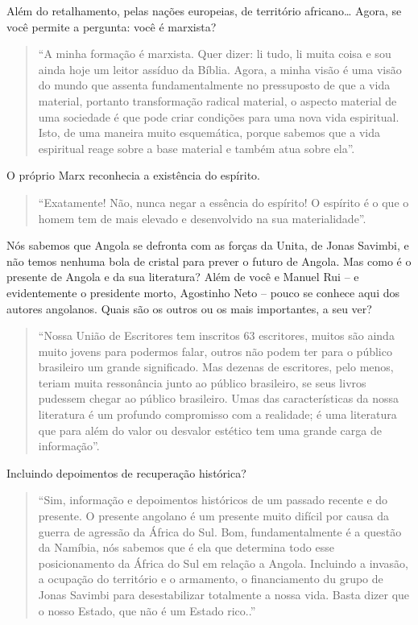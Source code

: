 \documentclass[
  letterpaper,
  DIV=11,
  numbers=noendperiod]{scrreprt}
\begin{document}
Além do retalhamento, pelas nações europeias, de território
africano\ldots{} Agora, se você permite a pergunta: você é marxista?

\begin{quote}
``A minha formação é marxista. Quer dizer: li tudo, li muita coisa e sou
ainda hoje um leitor assíduo da Bíblia. Agora, a minha visão é uma visão
do mundo que assenta fundamentalmente no pressuposto de que a vida
material, portanto transformação radical material, o aspecto material de
uma sociedade é que pode criar condições para uma nova vida espiritual.
Isto, de uma maneira muito esquemática, porque sabemos que a vida
espiritual reage sobre a base material e também atua sobre ela''.
\end{quote}

O próprio Marx reconhecia a existência do espírito.

\begin{quote}
``Exatamente! Não, nunca negar a essência do espírito! O espírito é o
que o homem tem de mais elevado e desenvolvido na sua materialidade''.
\end{quote}

Nós sabemos que Angola se defronta com as forças da Unita, de Jonas
Savimbi, e não temos nenhuma bola de cristal para prever o futuro de
Angola. Mas como é o presente de Angola e da sua literatura? Além de
você e Manuel Rui -- e evidentemente o presidente morto, Agostinho Neto
-- pouco se conhece aqui dos autores angolanos. Quais são os outros ou
os mais importantes, a seu ver?

\begin{quote}
``Nossa União de Escritores tem inscritos 63 escritores, muitos são
ainda muito jovens para podermos falar, outros não podem ter para o
público brasileiro um grande significado. Mas dezenas de escritores,
pelo menos, teriam muita ressonância junto ao público brasileiro, se
seus livros pudessem chegar ao público brasileiro. Umas das
características da nossa literatura é um profundo compromisso com a
realidade; é uma literatura que para além do valor ou desvalor estético
tem uma grande carga de informação''.
\end{quote}

Incluindo depoimentos de recuperação histórica?

\begin{quote}
``Sim, informação e depoimentos históricos de um passado recente e do
presente. O presente angolano é um presente muito difícil por causa da
guerra de agressão da África do Sul. Bom, fundamentalmente é a questão
da Namíbia, nós sabemos que é ela que determina todo esse posicionamento
da África do Sul em relação a Angola. Incluindo a invasão, a ocupação do
território e o armamento, o financiamento du grupo de Jonas Savimbi para
desestabilizar totalmente a nossa vida. Basta dizer que o nosso Estado,
que não é um Estado rico..''
\end{quote}
\end{document}
